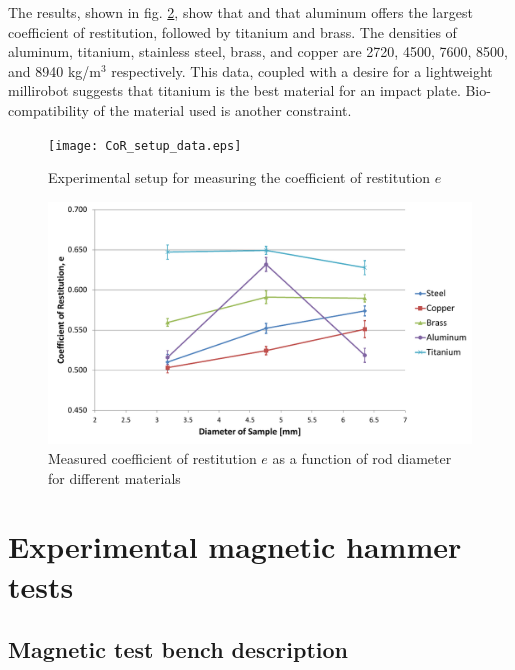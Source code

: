 \documentclass[letterpaper, 10 pt, conference]{ieeeconf}  %
\begin{document}
The results, shown in fig. \ref{CoR_Results}, show that and that aluminum offers the largest coefficient of restitution, followed by titanium and brass. The densities of aluminum, titanium, stainless steel, brass, and copper are 2720, 4500, 7600, 8500, and 8940 kg/m$^3$ respectively. This data, coupled with a desire for a lightweight millirobot suggests that titanium is the best material for an impact plate. Bio-compatibility of the material used is another constraint.

\begin{figure}
	\texttt{[image: CoR\_setup\_data.eps]}
	\caption{Experimental setup for measuring the coefficient of restitution $e$}
	\label{CoR_setup_data}
\end{figure}

\begin{figure}
	\includegraphics[width=\columnwidth]{CoRdata.pdf}
	\caption[Comparison of measured coefficients of restitution for different materials]{Measured coefficient of restitution $e$ as a function of rod diameter for different materials}
	\label{CoR_Results}
\end{figure}





\section{Experimental magnetic hammer tests}
\label{experiment}
\subsection{Magnetic test bench description}
\end{document}
